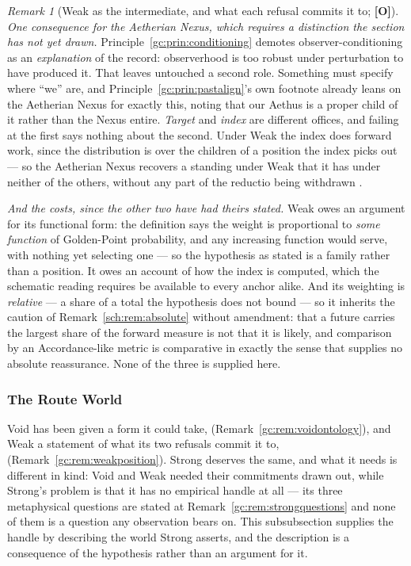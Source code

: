 \documentclass[11pt]{article}
\numberwithin{equation}{section}
\theoremstyle{plain}
\theoremstyle{definition}
\theoremstyle{remark}
\newtheorem{remark}[theorem]{Remark}
\begin{document}
\begin{remark}[Weak as the intermediate, and what each refusal commits
it to; \textbf{[O]}]
\emph{One consequence for the Aetherian Nexus, which requires a
distinction the section has not yet drawn.}
Principle~\ref{gc:prin:conditioning} demotes observer-conditioning as an
\emph{explanation} of the record: observerhood is too robust under
perturbation to have produced it. That leaves untouched a second role.
Something must specify where ``we'' are, and
Principle~\ref{gc:prin:pastalign}'s own footnote already leans on the
Aetherian Nexus for exactly this, noting that our Aethus is a proper
child of it rather than the Nexus entire. \emph{Target} and \emph{index}
are different offices, and failing at the first says nothing about the
second. Under Weak the index does forward work, since the distribution
is over the children of a position the index picks out --- so the
Aetherian Nexus recovers a standing under Weak that it has under neither
of the others, without any part of the reductio being withdrawn
\cite{Nexus}.

\emph{And the costs, since the other two have had theirs stated.} Weak
owes an argument for its functional form: the definition says the weight
is proportional to \emph{some function} of Golden-Point probability, and
any increasing function would serve, with nothing yet selecting one ---
so the hypothesis as stated is a family rather than a position. It owes
an account of how the index is computed, which the schematic reading
requires be available to every anchor alike. And its weighting is
\emph{relative} --- a share of a total the hypothesis does not bound ---
so it inherits the caution of Remark~\ref{sch:rem:absolute} without
amendment: that a future carries the largest share of the forward
measure is not that it is likely, and comparison by an Accordance-like
metric is comparative in exactly the sense that supplies no absolute
reassurance. None of the three is supplied here.
\end{remark}

\subsubsection{The Route World}\label{gc:subsub:routeworld}

Void has been given a form it could take, (Remark~\ref{gc:rem:voidontology}),
and Weak a statement of what its two refusals commit it to,
(Remark~\ref{gc:rem:weakposition}). Strong deserves the same, and what it needs is different in kind: Void and Weak needed their commitments
drawn out, while Strong's problem is that it has no empirical handle at
all --- its three metaphysical questions are stated at
Remark~\ref{gc:rem:strongquestions} and none of them is a question any
observation bears on. This subsubsection supplies the handle by
describing the world Strong asserts, and the description is a
consequence of the hypothesis rather than an argument for it.
\end{document}
